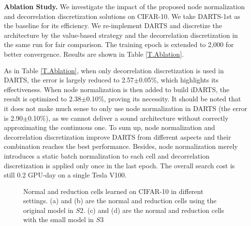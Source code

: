 \documentclass[journal]{IEEEtran}
\begin{document}
\label{EXP.Ablation}
\textbf{Ablation Study.} We investigate the impact of the proposed node normalization and decorrelation discretization solutions on CIFAR-10. We take DARTS-1st as the baseline for its efficiency. We re-implement DARTS and discretize the architecture by the value-based strategy and the decorrelation discretization in the same run for fair comparison. The training epoch is extended to 2,000 for better convergence. Results are shown in Table \ref{T.Ablation}.

As in Table \ref{T.Ablation}, when only decorrelation discretization is used in DARTS, the error is largely reduced to 2.57$\pm$0.05\%, which highlights its effectiveness. When node normalization is then added to build iDARTS, the result is optimized to 2.38$\pm$0.10\%, proving its necessity. It should be noted that it does not make much sense to only use node normalization in DARTS (the error is 2.90$\pm$0.10\%), as we cannot deliver a sound architecture without correctly approximating the continuous one. To sum up, node normalization and decorrelation discretization improve DARTS from different aspects and their combination reaches the best performance. Besides, node normalization merely introduces a static batch normalization to each cell and decorrelation discretization is applied only once in the last epoch. The overall search cost is still 0.2 GPU-day on a single Tesla V100. 



\begin{figure*}[!htbp]
   \caption{Normal and reduction cells learned on CIFAR-10 in different settings. (a) and (b) are the normal and reduction cells using the original model in $S2$. (c) and (d) are the normal and reduction cells with the small model in $S3$}
\label{fig:S1}
\end{figure*}
\end{document}
